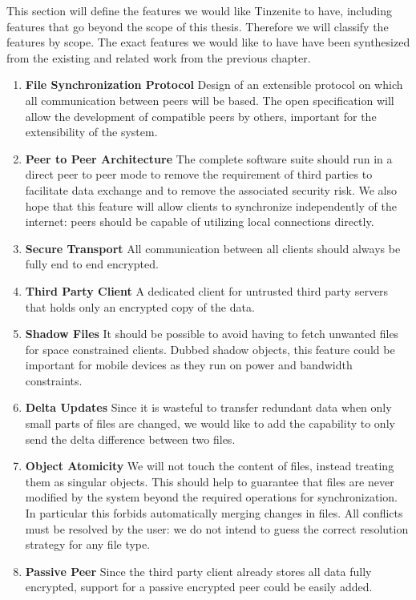 This section will define the features we would like Tinzenite to have, including features that go beyond the scope of this thesis.
Therefore we will classify the features by scope.
The exact features we would like to have have been synthesized from the existing and related work from the previous chapter.

\begin{enumerate}
\item \textbf{File Synchronization Protocol}
    Design of an extensible protocol on which all communication between peers will be based.
    The open specification will allow the development of compatible peers by others, important for the extensibility of the system.
\item \textbf{Peer to Peer Architecture}
    The complete software suite should run in a direct peer to peer mode to remove the requirement of third parties to facilitate data exchange and to remove the associated security risk.
    We also hope that this feature will allow clients to synchronize independently of the internet: peers should be capable of utilizing local connections directly.
\item \textbf{Secure Transport}
    All communication between all clients should always be fully end to end encrypted.
\item \textbf{Third Party Client}
    A dedicated client for untrusted third party servers that holds only an encrypted copy of the data.
\item \textbf{Shadow Files}
    It should be possible to avoid having to fetch unwanted files for space constrained clients.
    Dubbed shadow objects, this feature could be important for mobile devices as they run on power and bandwidth constraints.
\item \textbf{Delta Updates}
    Since it is wasteful to transfer redundant data when only small parts of files are changed, we would like to add the capability to only send the delta difference between two files.
\item \textbf{Object Atomicity}
    We will not touch the content of files, instead treating them as singular objects.
    This should help to guarantee that files are never modified by the system beyond the required operations for synchronization.
    In particular this forbids automatically merging changes in files.
    All conflicts must be resolved by the user: we do not intend to guess the correct resolution strategy for any file type.
\item \textbf{Passive Peer}
    Since the third party client already stores all data fully encrypted, support for a passive encrypted peer could be easily added.

\end{enumerate}
